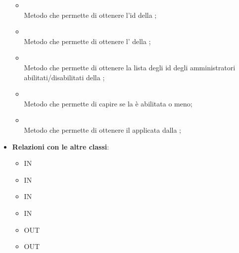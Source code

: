 \begin{itemize}
\begin{itemize}
		\item[]  \\		Metodo che permette di ottenere l'id della ;\\
		\item[]  \\		Metodo che permette di ottenere l' della ;\\
		\item[]  \\		Metodo che permette di ottenere la lista degli id degli amministratori abilitati/disabilitati della ;\\
		\item[]  \\		Metodo che permette di capire se la  è abilitata o meno;\\
		\item[]  \\		Metodo che permette di ottenere il  applicata dalla ;\\
	\end{itemize}
	\item \textbf{Relazioni con le altre classi}:
	\begin{itemize}
		\item IN \hyperlink{<<interface>> RulesDAO_label}{}
		\item IN \hyperlink{RuleObserver_label}{}
		\item IN \hyperlink{RulesDAODynamoDB_label}{}
		\item IN \hyperlink{VocalAPI_label}{}
		\item OUT \hyperlink{RuleTarget_label}{}
		\item OUT \hyperlink{RuleTaskInstance_label}{}
	\end{itemize}
\end{itemize}
\FloatBarrier

